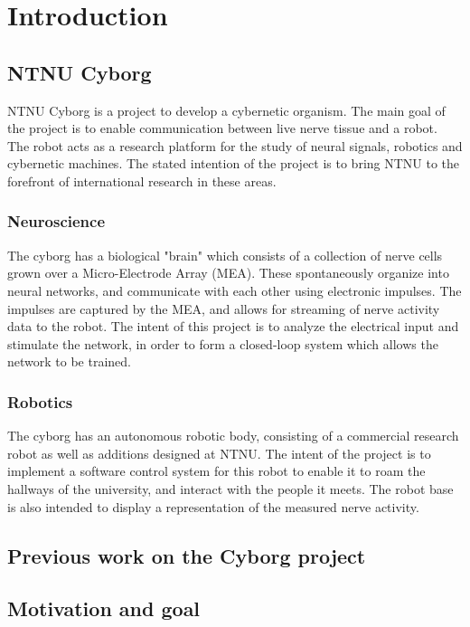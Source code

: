 \documentclass[\rootfolder/main.tex]{subfiles}
\begin{document}
\chapter{Introduction} %

\label{ch:introduction} %

\section{NTNU Cyborg}

NTNU Cyborg is a project to develop a cybernetic organism.
The main goal of the project is to enable communication between live nerve tissue and a robot.
The robot acts as a research platform for the study of neural signals, robotics and cybernetic machines.
The stated intention of the project is to bring NTNU to the forefront of international research in these areas.

\subsection{Neuroscience}

The cyborg has a biological "brain" which consists of a collection of nerve cells grown over a Micro-Electrode Array (MEA).
These spontaneously organize into neural networks, and communicate with each other using electronic impulses.
The impulses are captured by the MEA, and allows for streaming of nerve activity data to the robot.
The intent of this project is to analyze the electrical input and stimulate the network, in order to form a closed-loop system which allows the network to be trained.

\subsection{Robotics}

The cyborg has an autonomous robotic body, consisting of a commercial research robot as well as additions designed at NTNU.
The intent of the project is to implement a software control system for this robot to enable it to roam the hallways of the university, and interact with the people it meets.
The robot base is also intended to display a representation of the measured nerve activity.

\section{Previous work on the Cyborg project}

\section{Motivation and goal}
\end{document}
